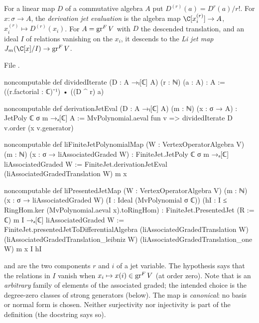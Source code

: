 \begin{definition}\label{l11:def:jetmap}
For a linear map $D$ of a commutative algebra $A$ put $D^{(r)}(a) = D^r(a)/r!$. For $x:\sigma\to A$, the
\emph{derivation jet evaluation} is the algebra map $\C[x_i^{(r)}]\to A$, $x_i^{(r)}\mapsto D^{(r)}(x_i)$. For
$A = \operatorname{gr}^FV$ with $D$ the descended translation, and an ideal $I$ of relations vanishing on the $x_i$, it
descends to the \emph{Li jet map} $J_m(\C[x]/I)\to\lelevengr^FV$.
\end{definition}
\noindent File .
\begin{leancode}
noncomputable def dividedIterate (D : A →ₗ[ℂ] A) (r : ℕ) (a : A) : A :=
  ((r.factorial : ℂ)⁻¹) • ((D ^ r) a)

noncomputable def derivationJetEval (D : A →ₗ[ℂ] A) (m : ℕ) (x : σ → A) :
    JetPoly ℂ σ m →ₐ[ℂ] A :=
  MvPolynomial.aeval fun v => dividedIterate D v.order (x v.generator)

noncomputable def liFiniteJetPolynomialMap (W : VertexOperatorAlgebra V) (m : ℕ)
    (x : σ → liAssociatedGraded W) :
    FiniteJet.JetPoly ℂ σ m →ₐ[ℂ] liAssociatedGraded W :=
  FiniteJet.derivationJetEval (liAssociatedGradedTranslation W) m x

noncomputable def liPresentedJetMap (W : VertexOperatorAlgebra V) (m : ℕ)
    (x : σ → liAssociatedGraded W) (I : Ideal (MvPolynomial σ ℂ))
    (hI : I ≤ RingHom.ker (MvPolynomial.aeval x).toRingHom) :
    FiniteJet.PresentedJet (R := ℂ) m I →ₐ[ℂ] liAssociatedGraded W :=
  FiniteJet.presentedJetToDifferentialAlgebra (liAssociatedGradedTranslation W)
    (liAssociatedGradedTranslation_leibniz W) (liAssociatedGradedTranslation_one W) m x I hI
\end{leancode}

\begin{dictionary}
 and  are the two components $r$ and $i$ of a jet variable. The hypothesis
\allowbreak{}\allowbreak{}\allowbreak{} says that the relations in $I$ vanish when
$x_i\mapsto x(i)\in\operatorname{gr}^FV$ (at order zero). Note that  is an \emph{arbitrary} family of elements of
the associated graded; the intended choice is the degree-zero classes of strong generators (below). The map is
\emph{canonical}: no basis or normal form is chosen. Neither surjectivity nor injectivity is part of the
definition (the docstring says so).
\end{dictionary}

